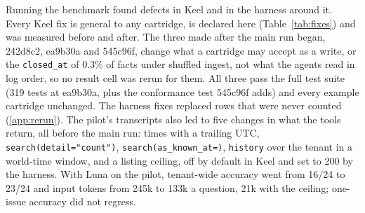 \documentclass{article}
\newcommand{\code}[1]{\texttt{#1}}
\begin{document}
Running the benchmark found defects in Keel and in the harness around it. Every Keel fix is general to any cartridge, is declared here (Table~\ref{tab:fixes}) and was measured before and after. The three made after the main run began, 242d8c2, ea9b30a and 545c96f, change what a cartridge may accept as a write, or the \code{closed\_at} of 0.3\% of facts under shuffled ingest, not what the agents read in log order, so no result cell was rerun for them. All three pass the full test suite (319 tests at ea9b30a, plus the conformance test 545c96f adds) and every example cartridge unchanged. The harness fixes replaced rows that were never counted (\ref{app:rerun}). The pilot's transcripts also led to five changes in what the tools return, all before the main run: times with a trailing UTC, \code{search(detail="count")}, \code{search(as\_known\_at=)}, \code{history} over the tenant in a world-time window, and a listing ceiling, off by default in Keel and set to 200 by the harness. With Luna on the pilot, tenant-wide accuracy went from 16/24 to 23/24 and input tokens from 245k to 133k a question, 21k with the ceiling; one-issue accuracy did not regress.
\end{document}
